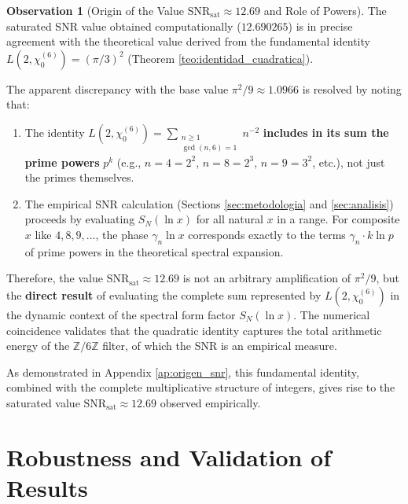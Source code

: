 \documentclass[12pt, a4paper]{article}
\theoremstyle{plain}
\theoremstyle{definition}
\newtheorem{observacion}[teorema]{Observation}
\theoremstyle{remark}
\begin{document}
\begin{observacion}[Origin of the Value $\mathrm{SNR}_{\mathrm{sat}} \approx 12.69$ and Role of Powers]
The saturated SNR value obtained computationally ($12.690265$) is in precise agreement with the theoretical value derived from the fundamental identity $L(2, \chi_0^{(6)}) = (\pi/3)^2$ (Theorem \ref{teo:identidad_cuadratica}).

The apparent discrepancy with the base value $\pi^2/9 \approx 1.0966$ is resolved by noting that:
\begin{enumerate}
    \item The identity $L(2, \chi_0^{(6)}) = \sum_{\substack{n \geq 1 \\ \gcd(n,6)=1}} n^{-2}$ \textbf{includes in its sum the prime powers} $p^k$ (e.g., $n=4=2^2$, $n=8=2^3$, $n=9=3^2$, etc.), not just the primes themselves.
    \item The empirical SNR calculation (Sections \ref{sec:metodologia} and \ref{sec:analisis}) proceeds by evaluating $S_N(\ln x)$ for all natural $x$ in a range. For composite $x$ like $4, 8, 9,\dots$, the phase $\gamma_n \ln x$ corresponds exactly to the terms $\gamma_n \cdot k \ln p$ of prime powers in the theoretical spectral expansion.
\end{enumerate}
Therefore, the value $\mathrm{SNR}_{\mathrm{sat}} \approx 12.69$ is not an arbitrary amplification of $\pi^2/9$, but the \textbf{direct result} of evaluating the complete sum represented by $L(2, \chi_0^{(6)})$ in the dynamic context of the spectral form factor $S_N(\ln x)$. The numerical coincidence validates that the quadratic identity captures the total arithmetic energy of the $\mathbb{Z}/6\mathbb{Z}$ filter, of which the SNR is an empirical measure.
\end{observacion}

As demonstrated in Appendix \ref{ap:origen_snr}, this fundamental identity, combined with the complete multiplicative structure of integers, gives rise to the saturated value $\mathrm{SNR}_{\mathrm{sat}} \approx 12.69$ observed empirically.


\section{Robustness and Validation of Results}
\label{sec:robustez}
\end{document}
